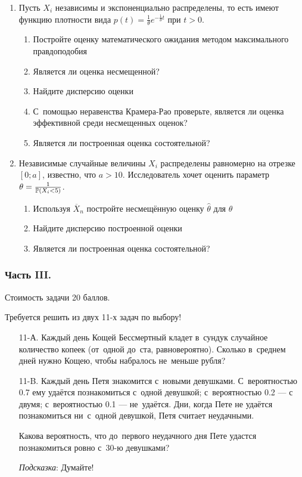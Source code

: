 \begin{enumerate}
\item Пусть $X_{i}$ независимы и экспоненциально
распределены, то есть имеют функцию плотности вида
$p(t)=\frac{1}{\theta}e^{-\frac{1}{\theta}t}$ при $t>0$.
\begin{enumerate}
\item Постройте оценку математического ожидания методом максимального
правдоподобия
\item Является ли оценка несмещенной?
\item Найдите дисперсию оценки
\item С~помощью неравенства Крамера-Рао проверьте, является ли
оценка эффективной среди несмещенных оценок?
\item Является ли построенная оценка состоятельной?
\end{enumerate}


\item Независимые случайные величины $X_{i}$ распределены
равномерно на отрезке $[0;a]$, известно, что $a>10$. Исследователь
хочет оценить
параметр $\theta=\frac{1}{\P(X_{i}<5)}$.
\begin{enumerate}
\item Используя $\overline{X}_{n}$ постройте несмещённую оценку
$\hat{\theta}$ для $\theta$
\item Найдите дисперсию построенной оценки
\item Является ли построенная оценка состоятельной?
\end{enumerate}
\end{enumerate}

\subsubsection*{Часть III.}

Стоимость задачи 20 баллов.

Требуется решить \textbf{} из двух 11-х задач по
выбору!

\begin{enumerate}
\item[11-А.] Каждый день Кощей Бессмертный кладет в~сундук случайное количество
копеек (от~одной до~ста, равновероятно). Сколько в~среднем дней нужно Кощею, чтобы набралось не~меньше рубля?

\item[11-B.] Каждый день Петя знакомится с~новыми девушками. С~вероятностью 0.7
ему удаётся познакомиться с~одной девушкой; с~вероятностью 0.2 — с
двумя; с~вероятностью 0.1 — не~удаётся. Дни, когда Пете не удаётся
познакомиться ни~с~одной девушкой, Петя считает неудачными.

Какова вероятность, что до~первого неудачного дня Пете удастся
познакомиться ровно с~30-ю девушками?

\emph{Подсказка}: Думайте!
\end{enumerate}

